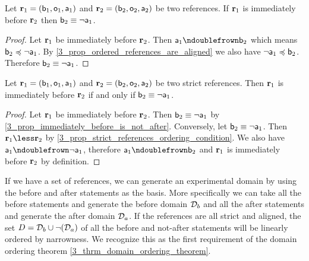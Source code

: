 \documentclass[11pt,letterpaper,fleqn]{memoir} %
\begin{document}
\begin{mathSection}
\begin{prop}\label{3_prop_immediately_before_is_not_after}
	Let $\refStmt_1 = ( \stmt[b]_1, \stmt[o]_1, \stmt[a]_1 )$ and $\refStmt_2 = ( \stmt[b]_2, \stmt[o]_2, \stmt[a]_2 )$ be two references. If $\refStmt_1$ is immediately before $\refStmt_2$ then $\stmt[b]_2 \equiv \NOT \stmt[a]_1$.
\end{prop}
\begin{proof}
	Let $\refStmt_1$ be immediately before $\refStmt_2$. Then $\stmt[a]_1 \ncomp \stmt[b]_2$ which means $\stmt[b]_2 \narrower \NOT \stmt[a]_1$. By \ref{3_prop_ordered_references_are_aligned} we also have $\NOT \stmt[a]_1 \narrower \stmt[b]_2$. Therefore $\stmt[b]_2 \equiv \NOT \stmt[a]_1$.
\end{proof}

\begin{prop}\label{3_prop_strict_consecutive_before_is_not_after}
	Let $\refStmt_1 = ( \stmt[b]_1, \stmt[o]_1, \stmt[a]_1 )$ and $\refStmt_2 = ( \stmt[b]_2, \stmt[o]_2, \stmt[a]_2 )$ be two strict references. Then $\refStmt_1$ is immediately before $\refStmt_2$ if and only if $\stmt[b]_2 \equiv \NOT \stmt[a]_1$.
\end{prop}
\begin{proof}
	Let $\refStmt_1$ be immediately before $\refStmt_2$. Then $\stmt[b]_2 \equiv \NOT \stmt[a]_1$ by \ref{3_prop_immediately_before_is_not_after}. Conversely, let $\stmt[b]_2 \equiv \NOT \stmt[a]_1$. Then $\refStmt_1 \less \refStmt_2$ by \ref{3_prop_strict_references_ordering_condition}. We also have $\stmt[a]_1 \ncomp \NOT \stmt[a]_1$, therefore $\stmt[a]_1 \ncomp \stmt[b]_2$ and $\refStmt_1$ is immediately before $\refStmt_2$ by definition.
\end{proof}

\end{mathSection}

If we have a set of references, we can generate an experimental domain by using the before and after statements as the basis. More specifically we can take all the before statements and generate the before domain $\edomain_b$ and all the after statements and generate the after domain $\edomain_a$. If the references are all strict and aligned, the set $D=\edomain_b \cup \NOT (\edomain_a)$ of all the before and not-after statements will be linearly ordered by narrowness. We recognize this as the first requirement of the domain ordering theorem \ref{3_thrm_domain_ordering_theorem}.
\end{document}
